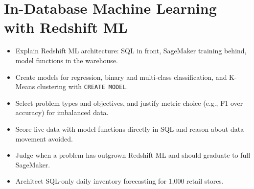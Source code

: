 \chapter{In-Database Machine Learning with Redshift ML}
%
\begin{objectives}
\begin{itemize}
    \item Explain Redshift ML architecture: SQL in front, SageMaker training behind, model functions in the warehouse.
    \item Create models for regression, binary and multi-class classification, and K-Means clustering with \texttt{CREATE MODEL}.
    \item Select problem types and objectives, and justify metric choice (e.g., F1 over accuracy) for imbalanced data.
    \item Score live data with model functions directly in SQL and reason about data movement avoided.
    \item Judge when a problem has outgrown Redshift ML and should graduate to full SageMaker.
    \item Architect SQL-only daily inventory forecasting for 1{,}000 retail stores.
\end{itemize}
\end{objectives}

